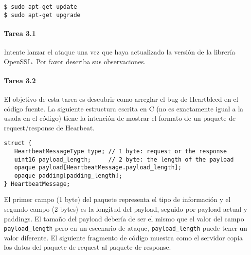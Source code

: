 \begin{lstlisting}
$ sudo apt-get update
$ sudo apt-get upgrade
\end{lstlisting}


\paragraph{Tarea 3.1} Intente lanzar el ataque una vez que haya actualizado la versión de la librería OpenSSL. Por favor describa sus observaciones.


\paragraph{Tarea 3.2} El objetivo de esta tarea es descubrir como arreglar el bug de Heartbleed en el código fuente. La siguiente estructura escrita en C (no es exactamente igual a la usada en el código) tiene la intención de mostrar el formato de un paquete de request/response de Hearbeat.


\begin{lstlisting}
struct {
   HeartbeatMessageType type; // 1 byte: request or the response
   uint16 payload_length;     // 2 byte: the length of the payload
   opaque payload[HeartbeatMessage.payload_length]; 
   opaque padding[padding_length]; 
} HeartbeatMessage;
\end{lstlisting}

El primer campo (1 byte) del paquete representa el tipo de información y el segundo campo (2 bytes) es la longitud del payload, seguido por payload actual y paddings. El tamaño del payload debería de ser el mismo que el valor del campo \texttt{payload\_length} pero en un escenario de ataque, \texttt{payload\_length}  puede tener un valor diferente. El siguiente fragmento de código muestra como el servidor copia los datos del paquete de request al paquete de response.


